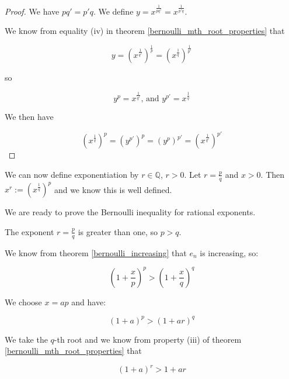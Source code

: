 \begin{proof}

We have $p q' = p' q$. We define $y = x^{\frac{1}{p q'}} = x^{\frac{1}{p' q}}$.

We know from equality (iv) in theorem \ref{bernoulli_mth_root_properties} that

$$
y = (x^{\frac{1}{q'}})^{\frac{1}{p}} = (x^{\frac{1}{q}})^{\frac{1}{p'}}
$$

so

$$
y^{p} = x^{\frac{1}{q'}} \text{, and } y^{p'} = x^{\frac{1}{q}}
$$

We then have

$$
(x^{\frac{1}{q}})^p = (y^{p'})^p = (y^{p})^{p'} = (x^{\frac{1}{q'}})^{p'}
$$

\end{proof}

We can now define exponentiation by $r \in \mathbb{Q}$, $r > 0$. Let $r = \frac{p}{q}$ and $x > 0$. Then $x^r := (x^{\frac{1}{q}})^p$ and we know this is well defined.

We are ready to prove the Bernoulli inequality for rational exponents.

The exponent $r = \frac{p}{q}$ is greater than one, so $p > q$.

We know from theorem \ref{bernoulli_increasing} that $e_n$ is increasing, so:

$$
(1 + \frac{x}{p})^{p} > (1 + \frac{x}{q})^{q}
$$

We choose $x = a p$ and have:

$$
(1 + a)^p > (1 + a r)^q
$$

We take the $q$-th root and we know from property (iii) of theorem \ref{bernoulli_mth_root_properties} that

$$
(1 + a)^r > 1 + a r
$$

